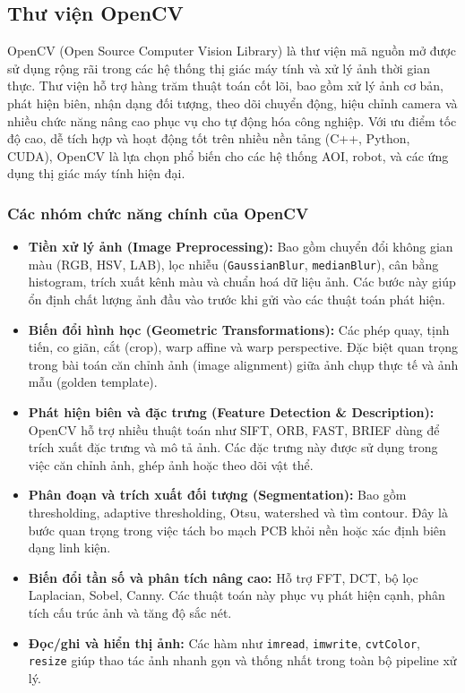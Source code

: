 \subsection{Thư viện OpenCV}

OpenCV (Open Source Computer Vision Library) là thư viện mã nguồn mở được sử dụng rộng rãi trong các hệ thống thị giác máy tính và xử lý ảnh thời gian thực. Thư viện hỗ trợ hàng trăm thuật toán cốt lõi, bao gồm xử lý ảnh cơ bản, phát hiện biên, nhận dạng đối tượng, theo dõi chuyển động, hiệu chỉnh camera và nhiều chức năng nâng cao phục vụ cho tự động hóa công nghiệp. Với ưu điểm tốc độ cao, dễ tích hợp và hoạt động tốt trên nhiều nền tảng (C++, Python, CUDA), OpenCV là lựa chọn phổ biến cho các hệ thống AOI, robot, và các ứng dụng thị giác máy tính hiện đại.

\subsubsection*{Các nhóm chức năng chính của OpenCV}

\begin{itemize}
    \item \textbf{Tiền xử lý ảnh (Image Preprocessing):}  
    Bao gồm chuyển đổi không gian màu (RGB, HSV, LAB), lọc nhiễu (\texttt{GaussianBlur}, \texttt{medianBlur}), cân bằng histogram, trích xuất kênh màu và chuẩn hoá dữ liệu ảnh. Các bước này giúp ổn định chất lượng ảnh đầu vào trước khi gửi vào các thuật toán phát hiện.

    \item \textbf{Biến đổi hình học (Geometric Transformations):}  
    Các phép quay, tịnh tiến, co giãn, cắt (crop), warp affine và warp perspective. Đặc biệt quan trọng trong bài toán căn chỉnh ảnh (image alignment) giữa ảnh chụp thực tế và ảnh mẫu (golden template).

    \item \textbf{Phát hiện biên và đặc trưng (Feature Detection \& Description):}  
    OpenCV hỗ trợ nhiều thuật toán như SIFT, ORB, FAST, BRIEF dùng để trích xuất đặc trưng và mô tả ảnh. Các đặc trưng này được sử dụng trong việc căn chỉnh ảnh, ghép ảnh hoặc theo dõi vật thể.

    \item \textbf{Phân đoạn và trích xuất đối tượng (Segmentation):}  
    Bao gồm thresholding, adaptive thresholding, Otsu, watershed và tìm contour. Đây là bước quan trọng trong việc tách bo mạch PCB khỏi nền hoặc xác định biên dạng linh kiện.

    \item \textbf{Biến đổi tần số và phân tích nâng cao:}  
    Hỗ trợ FFT, DCT, bộ lọc Laplacian, Sobel, Canny. Các thuật toán này phục vụ phát hiện cạnh, phân tích cấu trúc ảnh và tăng độ sắc nét.

    \item \textbf{Đọc/ghi và hiển thị ảnh:}  
    Các hàm như \texttt{imread}, \texttt{imwrite}, \texttt{cvtColor}, \texttt{resize} giúp thao tác ảnh nhanh gọn và thống nhất trong toàn bộ pipeline xử lý.
\end{itemize}

